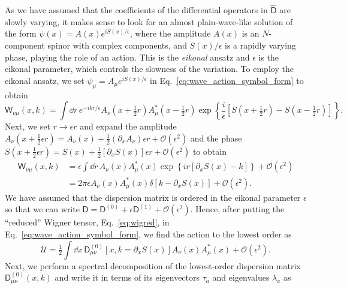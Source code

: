 As we have assumed that the coefficients of the differential operators in $\widehat{\mathsf{D}}$ are slowly varying, it makes sense to look for an almost plain-wave-like solution of the form
$\psi(x) = A(x)e^{iS(x)/\epsilon}$, where the amplitude $A(x)$ is an $N$-component spinor with complex components, and $S(x)/\epsilon$ is a rapidly varying phase, playing the role of an action.
This is the \emph{eikonal} ansatz and $\epsilon$ is the eikonal parameter, which controls the slowness of the variation.
To employ the eikonal ansatz, we set $\psi_{\mu} = A_{\mu}e^{iS(x)/\epsilon}$ in Eq.~\eqref{eq:wave_action_symbol_form} to obtain%
%
\begin{equation}
    \mathsf{W}_{\nu\mu}(x, k) = \int \dd{r}\,e^{-ikr/\epsilon} A_{\nu}\left(x + \tfrac{1}{2} r\right)A_{\mu}^{*}\left(x - \tfrac{1}{2} r\right)\exp\left\{\frac{i}{\epsilon}\left[S\left(x + \tfrac{1}{2} r\right) - S\left(x - \tfrac{1}{2} r\right)\right]\right\}.
\end{equation}
%
Next, we set $r \to \epsilon r$ and expand the amplitude $A_{\nu}(x + \tfrac{1}{2}\epsilon r) = A_{\nu}(x) + \tfrac{1}{2}(\partial_{x}A_{\nu})\epsilon r + \mathcal{O}(\epsilon^{2})$ and the phase $S(x + \tfrac{1}{2}\epsilon r) = S(x) + \tfrac{1}{2}[\partial_{x}S(x)]\epsilon r + \mathcal{O}(\epsilon^{2})$ to obtain
%
\begin{equation}
  \begin{aligned}
    \mathsf{W}_{\nu\mu}(x, k) &= \epsilon\int \dd{r}\,A_{\nu}(x)A_{\mu}^{*}(x)\exp\left\{ir\left[\partial_{x}S(x) - k\right]\right\} + \mathcal{O}(\epsilon^{2}) \\
                        &= 2\pi\epsilon A_{\nu}(x)A^{*}_{\mu}(x)\delta\left[k - \partial_{x}S(x)\right] + \mathcal{O}(\epsilon^{2}).
  \end{aligned}
  \label{eq:wigred}
\end{equation}
%
We have assumed that the dispersion matrix is ordered in the eikonal parameter $\epsilon$ so that we can write
%
$\mathsf{D} = \mathsf{D}^{(0)} + \epsilon \mathsf{D}^{(1)} + \mathcal{O}(\epsilon^{2})$.
%
Hence, after putting the ``reduced'' Wigner tensor, Eq.~\eqref{eq:wigred}, in Eq.~\eqref{eq:wave_action_symbol_form}, we find the action to the lowest order as
%
\begin{equation}
  \mathscr{U} = \tfrac{1}{2}\int \dd{x}\, \mathsf{D}^{(0)}_{\mu\nu}\left[x, k=\partial_{x}S(x)\right]A_{\nu}(x)A^{*}_{\mu}(x) + \mathcal{O}(\epsilon^{2}).
  \label{eq:wave_action_reduced_1}
\end{equation}
%
Next, we perform a spectral decomposition of the lowest-order dispersion matrix $\mathsf{D}^{(0)}_{\mu\nu}(x, k)$ and write it in terms of its eigenvectors $\tau_{a}$ and eigenvalues $\lambda_{a}$ as%
